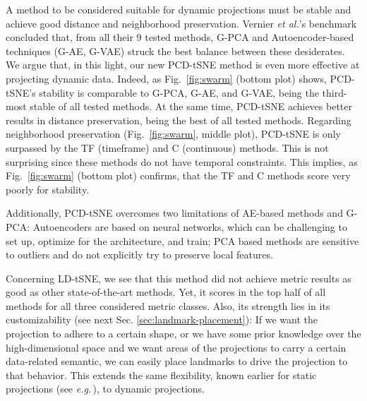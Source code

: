 A method to be considered suitable for dynamic projections must be stable and achieve good distance and neighborhood preservation. Vernier \emph{et al.}'s benchmark \citep{Vernier2020} concluded that, from all their 9 tested methods, G-PCA and Autoencoder-based techniques (G-AE, G-VAE) struck the best balance between these desiderates. We argue that, in this light, our new PCD-tSNE method is even more effective at projecting dynamic data. Indeed, as Fig.~\ref{fig:swarm} (bottom plot) shows, PCD-tSNE's stability is comparable to G-PCA, G-AE, and G-VAE, being the third-most stable of all tested methods. At the same time, PCD-tSNE achieves better results in distance preservation, being the best of all tested methods. Regarding neighborhood preservation (Fig.~\ref{fig:swarm}, middle plot), PCD-tSNE is only surpassed by the TF (timeframe) and C (continuous) methods. This is not surprising since these methods do not have temporal constraints. This implies, as Fig.~\ref{fig:swarm} (bottom plot) confirms, that the TF and C methods score very poorly for stability. 

Additionally, PCD-tSNE overcomes two limitations of AE-based methods and G-PCA: Autoencoders are based on neural networks, which can be challenging to set up, optimize for the architecture, and train; PCA based methods are sensitive to outliers and do not explicitly try to preserve local features.

Concerning LD-tSNE, we see that this method did not achieve metric results as good as other state-of-the-art methods. Yet, it scores in the top half of all methods for all three considered metric classes. Also, its strength lies in its customizability (see next Sec. \ref{sec:landmark-placement}): If we want the projection to adhere to a certain shape, or we have some prior knowledge over the high-dimensional space and we want areas of the projections to carry a certain data-related semantic, we can easily place landmarks to drive the projection to that behavior. This extends the same flexibility, known earlier for static projections (see \emph{e.g.}\,\citep{Joia2011,Pekalska1999}), to dynamic projections.

